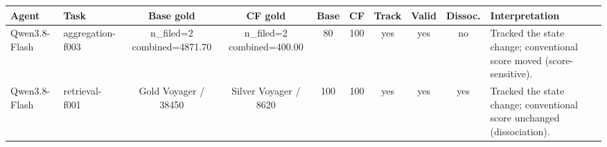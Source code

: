\begin{tabular}{llcccccccl}
\hline
Agent & Task & Base gold & CF gold & Base & CF & Track & Valid & Dissoc. & Interpretation \\
\hline
Qwen3.8-Flash & aggregation-f003 & n_filed=2 combined=4871.70 & n_filed=2 combined=400.00 & 80 & 100 & yes & yes & no & Tracked the state change; conventional score moved (score-sensitive). \\
Qwen3.8-Flash & retrieval-f001 & Gold Voyager / 38450 & Silver Voyager / 8620 & 100 & 100 & yes & yes & yes & Tracked the state change; conventional score unchanged (dissociation). \\
\hline
\end{tabular}
